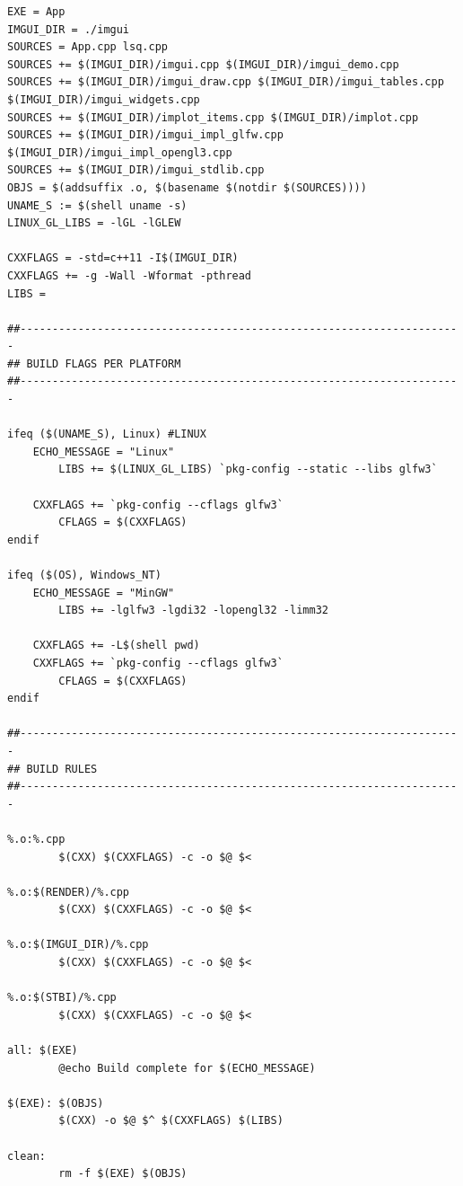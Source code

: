 \documentclass[14pt, letterpaper]{article}
\begin{document}
\begin{lstlisting}[caption=Makefile]
EXE = App
IMGUI_DIR = ./imgui
SOURCES = App.cpp lsq.cpp
SOURCES += $(IMGUI_DIR)/imgui.cpp $(IMGUI_DIR)/imgui_demo.cpp
SOURCES += $(IMGUI_DIR)/imgui_draw.cpp $(IMGUI_DIR)/imgui_tables.cpp $(IMGUI_DIR)/imgui_widgets.cpp
SOURCES += $(IMGUI_DIR)/implot_items.cpp $(IMGUI_DIR)/implot.cpp
SOURCES += $(IMGUI_DIR)/imgui_impl_glfw.cpp $(IMGUI_DIR)/imgui_impl_opengl3.cpp
SOURCES += $(IMGUI_DIR)/imgui_stdlib.cpp
OBJS = $(addsuffix .o, $(basename $(notdir $(SOURCES))))
UNAME_S := $(shell uname -s)
LINUX_GL_LIBS = -lGL -lGLEW

CXXFLAGS = -std=c++11 -I$(IMGUI_DIR)
CXXFLAGS += -g -Wall -Wformat -pthread
LIBS =

##---------------------------------------------------------------------
## BUILD FLAGS PER PLATFORM
##---------------------------------------------------------------------

ifeq ($(UNAME_S), Linux) #LINUX
	ECHO_MESSAGE = "Linux"
		LIBS += $(LINUX_GL_LIBS) `pkg-config --static --libs glfw3`

	CXXFLAGS += `pkg-config --cflags glfw3`
		CFLAGS = $(CXXFLAGS)
endif

ifeq ($(OS), Windows_NT)
	ECHO_MESSAGE = "MinGW"
		LIBS += -lglfw3 -lgdi32 -lopengl32 -limm32

	CXXFLAGS += -L$(shell pwd)
	CXXFLAGS += `pkg-config --cflags glfw3`
		CFLAGS = $(CXXFLAGS)
endif

##---------------------------------------------------------------------
## BUILD RULES
##---------------------------------------------------------------------

%.o:%.cpp
		$(CXX) $(CXXFLAGS) -c -o $@ $<

%.o:$(RENDER)/%.cpp
		$(CXX) $(CXXFLAGS) -c -o $@ $<
	
%.o:$(IMGUI_DIR)/%.cpp
		$(CXX) $(CXXFLAGS) -c -o $@ $<

%.o:$(STBI)/%.cpp
		$(CXX) $(CXXFLAGS) -c -o $@ $<

all: $(EXE)
		@echo Build complete for $(ECHO_MESSAGE)

$(EXE): $(OBJS)
		$(CXX) -o $@ $^ $(CXXFLAGS) $(LIBS)

clean:
		rm -f $(EXE) $(OBJS)
\end{lstlisting}

\begin{spacing}{2.5}
\end{spacing}
\end{document}
